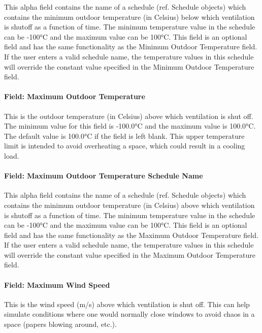 This alpha field contains the name of a schedule (ref. Schedule objects) which contains the minimum outdoor temperature (in Celsius) below which ventilation is shutoff as a function of time. The minimum temperature value in the schedule can be -100°C and the maximum value can be 100°C. This field is an optional field and has the same functionality as the Minimum Outdoor Temperature field. If the user enters a valid schedule name, the temperature values in this schedule will override the constant value specified in the Minimum Outdoor Temperature field.

\paragraph{Field: Maximum Outdoor Temperature}\label{field-maximum-outdoor-temperature}

This is the outdoor temperature (in Celsius) above which ventilation is shut off. The minimum value for this field is -100.0°C and the maximum value is 100.0°C. The default value is 100.0°C if the field is left blank. This upper temperature limit is intended to avoid overheating a space, which could result in a cooling load.

\paragraph{Field: Maximum Outdoor Temperature Schedule Name}\label{field-maximum-outdoor-temperature-schedule-name}

This alpha field contains the name of a schedule (ref. Schedule objects) which contains the minimum outdoor temperature (in Celsius) above which ventilation is shutoff as a function of time. The minimum temperature value in the schedule can be -100°C and the maximum value can be 100°C. This field is an optional field and has the same functionality as the Maximum Outdoor Temperature field. If the user enters a valid schedule name, the temperature values in this schedule will override the constant value specified in the Maximum Outdoor Temperature field.

\paragraph{Field: Maximum Wind Speed}\label{field-maximum-wind-speed}

This is the wind speed (m/s) above which ventilation is shut off. This can help simulate conditions where one would normally close windows to avoid chaos in a space (papers blowing around, etc.).


